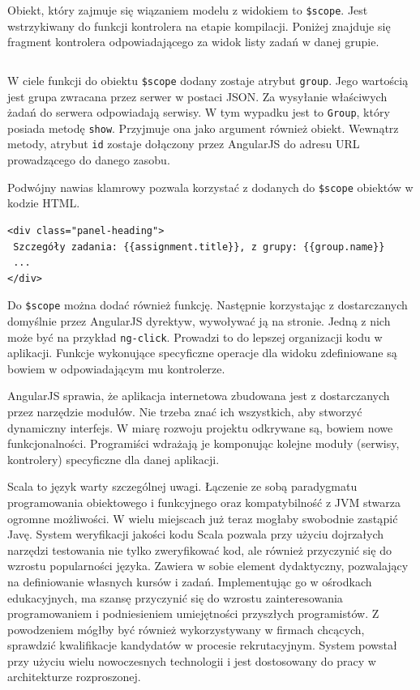 \documentclass[brudnopis]{xmgr}
\begin{document}
Obiekt, który zajmuje się wiązaniem modelu z widokiem to \texttt{\$scope}. Jest wstrzykiwany do funkcji kontrolera na etapie kompilacji. Poniżej znajduje się fragment kontrolera odpowiadającego za widok listy zadań w danej grupie.

\inputminted[fontsize=\small]{javascript}{code/angularController.js} 

W ciele funkcji do obiektu \texttt{\$scope} dodany zostaje atrybut \texttt{group}. Jego wartością jest grupa zwracana przez serwer w postaci JSON. Za wysyłanie właściwych żadań do serwera odpowiadają serwisy. W tym wypadku jest to \texttt{Group}, który posiada metodę \texttt{show}. Przyjmuje ona jako argument również obiekt. Wewnątrz metody, atrybut \texttt{id} zostaje dołączony przez AngularJS do adresu URL prowadzącego do danego zasobu.

Podwójny nawias klamrowy pozwala korzystać z dodanych do \texttt{\$scope} obiektów w kodzie HTML. 

\begin{verbatim}
<div class="panel-heading">
 Szczegóły zadania: {{assignment.title}}, z grupy: {{group.name}}
 ...
</div>
\end{verbatim}

Do \texttt{\$scope} można dodać również funkcję. Następnie korzystając z dostarczanych domyślnie przez AngularJS dyrektyw, wywoływać ją na stronie. Jedną z nich może być na przykład \texttt{ng-click}. Prowadzi to do lepszej organizacji kodu w aplikacji. Funkcje wykonujące specyficzne operacje dla widoku zdefiniowane są bowiem w odpowiadającym mu kontrolerze. 

AngularJS sprawia, że aplikacja internetowa zbudowana jest z dostarczanych przez narzędzie modułów. Nie trzeba znać ich wszystkich, aby stworzyć dynamiczny interfejs. W miarę rozwoju projektu odkrywane są, bowiem nowe funkcjonalności. Programiści wdrażają je komponując kolejne moduły (serwisy, kontrolery) specyficzne dla danej aplikacji.  

\summary
Scala to język warty szczególnej uwagi. Łączenie ze sobą paradygmatu programowania obiektowego i funkcyjnego oraz kompatybilność z JVM stwarza ogromne możliwości. W wielu miejscach już teraz mogłaby swobodnie zastąpić Javę. System weryfikacji jakości kodu Scala pozwala przy użyciu dojrzałych narzędzi testowania nie tylko zweryfikować kod, ale również przyczynić się do wzrostu popularności języka. Zawiera w sobie element dydaktyczny, pozwalający na definiowanie własnych kursów i zadań. Implementując go w ośrodkach edukacyjnych, ma szansę przyczynić się do wzrostu zainteresowania programowaniem i podniesieniem umiejętności przyszłych programistów. Z powodzeniem mógłby być również wykorzystywany w firmach chcących, sprawdzić kwalifikacje kandydatów w procesie rekrutacyjnym.
System powstał przy użyciu wielu nowoczesnych technologii i jest dostosowany do pracy w architekturze rozproszonej.
\end{document}
